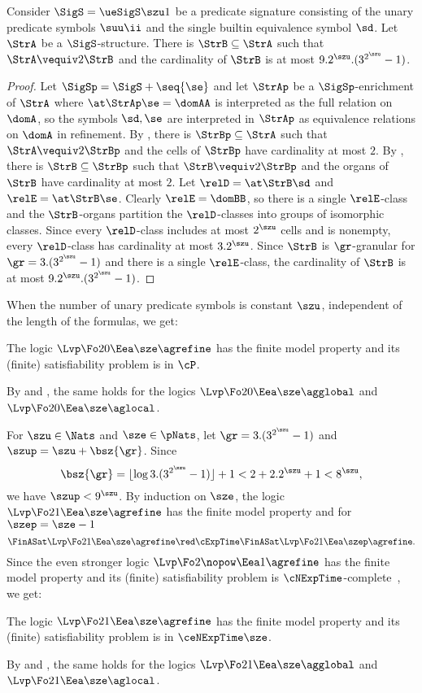 \begin{remark}
Consider $\SigS = \ueSigS\szu1$ be a predicate signature consisting of the unary
predicate symbols $\suu\ii$ and the single builtin equivalence symbol $\sd$. 
Let $\StrA$ be a $\SigS$-structure.
There is $\StrB \subseteq \StrA$ such that $\StrA \vequiv2 \StrB$ and the
cardinality of $\StrB$ is at most $9.2^\szu.(3^{2^\szu}-1)$.
\end{remark}
\begin{proof}
Let $\SigSp = \SigS + \seq{\se}$ and let $\StrAp$ be a $\SigSp$-enrichment of
$\StrA$ where $\at\StrAp\se = \domAA$ is interpreted as the full relation on
$\domA$, so the symbols $\sd, \se$ are interpreted in $\StrAp$ as equivalence
relations on $\domA$ in refinement.
By , there is $\StrBp \subseteq \StrA$ such that
$\StrA \vequiv2 \StrBp$ and the cells of $\StrBp$ have cardinality at most $2$.
By , there is $\StrB \subseteq \StrBp$ such that
$\StrB \vequiv2 \StrBp$ and the organs of $\StrB$ have cardinality at most $2$.
Let $\relD = \at\StrB\sd$ and $\relE = \at\StrB\se$.
Clearly $\relE = \domBB$, so there is a single $\relE$-class and the
$\StrB$-organs partition the $\relD$-classes into groups of isomorphic classes.
Since every $\relD$-class includes at most $2^\szu$ cells and is nonempty, every
$\relD$-class has cardinality at most $3.2^\szu$.
Since $\StrB$ is $\gr$-granular for $\gr = 3.(3^{2^\szu}-1)$ and there is a
single $\relE$-class, the cardinality of $\StrB$ is at most
$9.2^\szu.(3^{2^\szu}-1)$.
\end{proof}

When the number of unary predicate symbols is constant $\szu$, independent of
the length of the formulas, we get:
\begin{proposition}
The logic $\Lvp\Fo20\Eea\sze\agrefine$ has the finite model
property and its (finite) satisfiability problem is in $\cP$.

By  and ,
the same holds for the logics
$\Lvp\Fo20\Eea\sze\agglobal$ and 
$\Lvp\Fo20\Eea\sze\aglocal$.
\end{proposition}

For $\szu \in \Nats$ and $\sze \in \pNats$, let $\gr = 3.(3^{2^\szu}-1)$
and $\szup = \szu + \bsz{\gr}$.
Since
\[
  \bsz{\gr} = \lfloor \log{3.(3^{2^\szu}-1)} \rfloor + 1 <
   2 + 2.2^\szu+1 <
   8^\szu,
\]
we have $\szup < 9^\szu$.
By induction on $\sze$, the logic $\Lvp\Fo21\Eea\sze\agrefine$ has the
finite model property and for $\szep = \sze-1$
\[
\FinASat\Lvp\Fo21\Eea\sze\agrefine \red\cExpTime
\FinASat\Lvp\Fo21\Eea\szep\agrefine.
\]
Since the even stronger logic $\Lvp\Fo2\nopow\Eea1\agrefine$ has the
finite model property and its (finite) satisfiability problem is
$\cNExpTime$-complete~\cite{kieronski2005small}, we get:
\begin{proposition}
The logic $\Lvp\Fo21\Eea\sze\agrefine$ has the finite model property and
its (finite) satisfiability problem is in $\ceNExpTime\sze$.

By  and ,
the same holds for the logics
$\Lvp\Fo21\Eea\sze\agglobal$ and $\Lvp\Fo21\Eea\sze\aglocal$.
\end{proposition}

